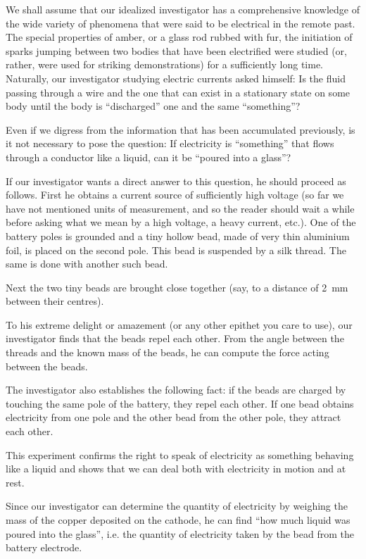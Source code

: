 We shall assume that our idealized investigator has a comprehensive knowledge of the wide variety of phenomena that were said to be electrical in the remote past. The special properties of amber, or a glass rod rubbed with fur, the initiation of sparks jumping between two bodies that have been electrified were studied (or, rather, were used for striking demonstrations) for a sufficiently long time. Naturally, our investigator studying electric currents asked himself: Is the fluid passing through a wire and the one that can exist in a stationary state on some body until the body is ``discharged'' one and the same ``something''?

Even if we digress from the information that has been accumulated previously, is it not necessary to pose the question: If electricity is ``something'' that flows through a conductor like a liquid, can it be ``poured into a glass''?

If our investigator wants a direct answer to this question, he should proceed as follows. First he obtains a current source of sufficiently high voltage (so far we have not mentioned units of measurement, and so the reader should wait a while before asking what we mean by a high voltage, a heavy current, etc.). One of the battery poles is grounded and a tiny hollow bead, made of very thin aluminium foil, is placed on the second pole. This bead is suspended by a silk thread. The same is done with another such bead.

Next the two tiny beads are brought close together (say, to a distance of \SI{2}{\milli\meter} between their centres).

To his extreme delight or amazement (or any other epithet you care to use), our investigator finds that the beads repel each other. From the angle between the threads and the known mass of the beads, he can compute the force acting between the beads.

The investigator also establishes the following fact: if the beads are charged by touching the same pole of the battery, they repel each other. If one bead obtains electricity from one pole and the other bead from the other pole, they attract each other.

This experiment confirms the right to speak of electricity as something behaving like a liquid and shows that we can deal both with electricity in motion and at rest.

Since our investigator can determine the quantity of electricity by weighing the mass of the copper deposited on the cathode, he can find ``how much liquid was poured into the glass'', i.e. the quantity of electricity taken by the bead from the battery electrode.

